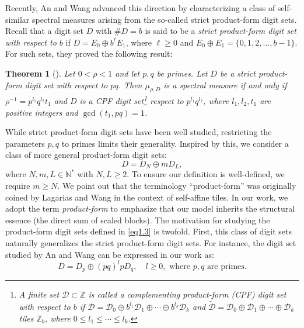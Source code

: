 \documentclass[11pt]{article}
\newtheorem{theorem}{Theorem}[section]
\numberwithin{equation}{section}
\begin{document}
Recently, An and Wang \cite[Theorem 1.7]{An2021} advanced this direction by characterizing a class of self-similar spectral measures arising from the so-called strict product-form digit sets. Recall that a digit set $D$ with $\#D=b$ is said to be a \emph{strict product-form digit set with respect to $b$} if $D=E_0\oplus b^{\ell} E_1$, where $ \ell\geq 0$ and $E_0\oplus E_1=\{0,1,2,\dots, b-1\}$. For such sets, they proved the following result:
\begin{theorem}[\cite{An2021}]\label{A}
	Let \( 0 < \rho < 1 \) and let \( p, q \) be primes. Let \( D \) be a strict product-form digit set with respect to \( pq \). Then \( \mu_{\rho,D} \) is a spectral measure if and only if \( \rho^{-1} = p^{l_1}q^{l_2}t_1 \) and \( D \) is a CPF digit set\footnote{A finite set \( \mathcal{D} \subset \mathbb{Z} \) is called a complementing product-form (CPF) digit set with respect to \( b \) if  
		$ \mathcal{D} = \mathcal{D}_0 \oplus b^{l_1} \mathcal{D}_1 \oplus \cdots \oplus b^{l_k} \mathcal{D}_k $
		and \( \tilde{\mathcal{D}} = \mathcal{D}_0 \oplus \mathcal{D}_1 \oplus \cdots \oplus \mathcal{D}_k \) tiles \( \mathbb{Z}_b \), where \( 0 \leq l_1 \leq \cdots \leq l_k \).} respect to \( p^{l_1}q^{l_2} \), where \( l_1, l_2, t_1 \) are positive integers and \( \gcd(t_1, pq) = 1 \).
\end{theorem}
While strict product-form digit sets have been well studied, restricting the parameters $p,q$ to primes limits their generality. Inspired by this, we consider a class of more general product-form digit sets: %
\begin{equation}\label{eq1.3}
	D = D_N \oplus mD_L,
\end{equation}
where $N, m, L \in \mathbb{N}^{*}$ with $N, L \geq 2$. To ensure our definition is well-defined, we require $m \ge N$. 
We point out that the terminology ``product-form'' was originally coined by Lagarias and Wang \cite{LW_1996_2} in the context of self-affine tiles. In our work, we adopt the term \emph{product-form} to emphasize that our model inherits the structural essence (the direct sum of scaled blocks). 
The motivation for studying the product-form digit sets defined in \eqref{eq1.3} is twofold. 
	First, this class of digit sets naturally generalizes the strict product-form digit sets. For instance, the digit set studied by An and Wang \cite{An2021} can be expressed in our work as:
	\begin{equation}\label{eq1.4}
		D=D_p\oplus (pq)^l p D_q,\quad l\geq 0, \text{ where } p,q \text{ are primes}.
	\end{equation}
\end{document}
